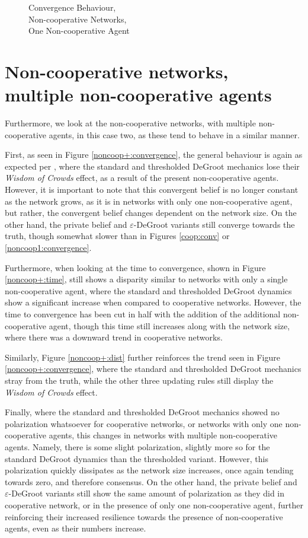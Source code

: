 \documentclass[a4paper, 12pt]{report}
\begin{document}
\begin{figure}[!htbp]
    \caption{Convergence Behaviour, \\ Non-cooperative Networks, \\ One Non-cooperative Agent}
\end{figure}

\newpage

\section{Non-cooperative networks, \\ multiple non-cooperative agents}
\label{results:noncoop+}
Furthermore, we look at the non-cooperative networks, with multiple non-cooperative agents, in this case two, as these tend to behave in a similar manner.

\noindent First, as seen in Figure \ref{noncoop+:convergence}, the general behaviour is again as expected per \cite{amir2021robust}, where the standard and thresholded DeGroot mechanics lose their \emph{Wisdom of Crowds} effect, as a result of the present non-cooperative agents. However, it is important to note that this convergent belief is no longer constant as the network grows, as it is in networks with only one non-cooperative agent, but rather, the convergent belief changes dependent on the network size. On the other hand, the private belief and $\varepsilon$-DeGroot variants still converge towards the truth, though somewhat slower than in Figures \ref{coop:conv} or \ref{noncoop1:convergence}.

\noindent Furthermore, when looking at the time to convergence, shown in Figure \ref{noncoop+:time}, still shows a disparity similar to networks with only a single non-cooperative agent, where the standard and thresholded DeGroot dynamics show a significant increase when compared to cooperative networks. However, the time to convergence has been cut in half with the addition of the additional non-cooperative agent, though this time still increases along with the network size, where there was a downward trend in cooperative networks.

\noindent Similarly, Figure \ref{noncoop+:dist} further reinforces the trend seen in Figure \ref{noncoop+:convergence}, where the standard and thresholded DeGroot mechanics stray from the truth, while the other three updating rules still display the \emph{Wisdom of Crowds} effect.

\noindent Finally, where the standard and thresholded DeGroot mechanics showed no polarization whatsoever for cooperative networks, or networks with only one non-cooperative agents, this changes in networks with multiple non-cooperative agents. Namely, there is some slight polarization, slightly more so for the standard DeGroot dynamics than the thresholded variant. However, this polarization quickly dissipates as the network size increases, once again tending towards zero, and therefore consensus. On the other hand, the private belief and $\varepsilon$-DeGroot variants still show the same amount of polarization as they did in cooperative network, or in the presence of only one non-cooperative agent, further reinforcing their increased resilience towards the presence of non-cooperative agents, even as their numbers increase.
\end{document}
